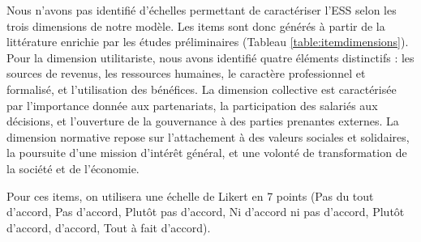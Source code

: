 Nous n’avons pas identifié d’échelles permettant de caractériser l’ESS selon les trois dimensions de notre modèle. Les items sont donc générés à partir de la littérature enrichie par les études préliminaires (Tableau \ref{table:itemdimensions}). Pour la dimension utilitariste, nous avons identifié quatre éléments distinctifs : les sources de revenus, les ressources humaines, le caractère professionnel et formalisé, et l’utilisation des bénéfices. La dimension collective est caractérisée par l’importance donnée aux partenariats, la participation des salariés aux décisions, et l’ouverture de la gouvernance à des parties prenantes externes. La dimension normative repose sur l’attachement à des valeurs sociales et solidaires, la poursuite d’une mission d’intérêt général, et une volonté de transformation de la société et de l’économie. 

Pour ces items, on utilisera une échelle de Likert en 7 points (Pas du tout d’accord, Pas d’accord, Plutôt pas d’accord, Ni d’accord ni pas d’accord, Plutôt d’accord, d’accord, Tout à fait d’accord). 

